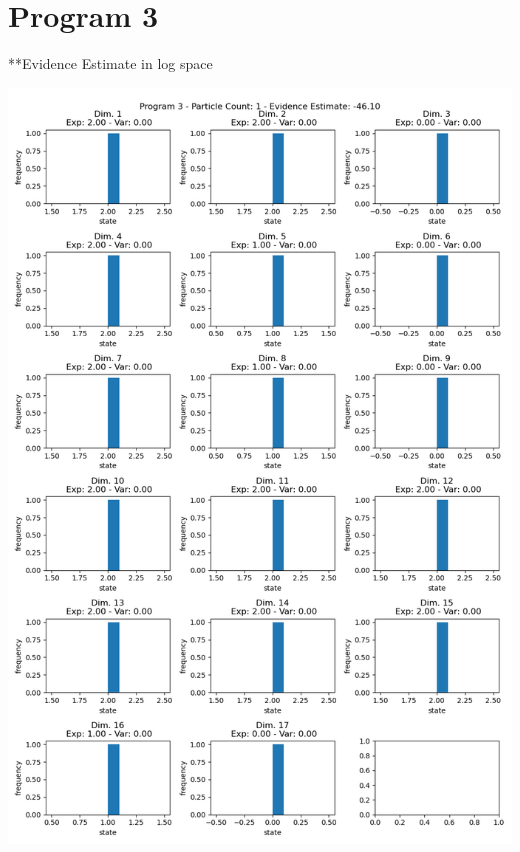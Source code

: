 \documentclass[10pt]{homeworg}
\begin{document}
\section*{Program 3}
\small{**Evidence Estimate in log space}
\begin{center}
\includegraphics[scale=0.5]{figures/program3/1_particles.png}
\end{center}

\newpage
\end{document}
